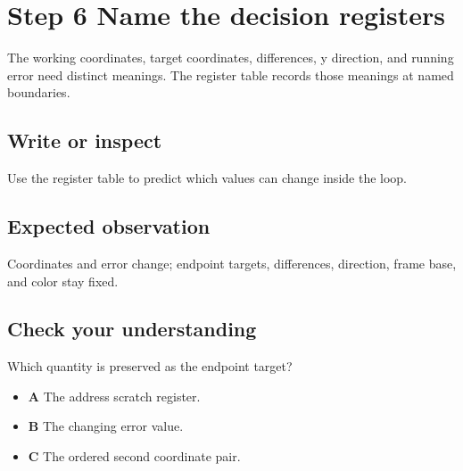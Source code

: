 \section{Step 6 Name the decision
  registers}\label{007-bresenham-line-s06-step-6-name-the-decision-registers}

The working coordinates, target coordinates, differences, y direction,
and running error need distinct meanings. The register table records
those meanings at named boundaries.

\subsection{Write or
  inspect}\label{007-bresenham-line-s06-write-or-inspect}

Use the register table to predict which values can change inside the
loop.

\subsection{Expected
  observation}\label{007-bresenham-line-s06-expected-observation}

Coordinates and error change; endpoint targets, differences, direction,
frame base, and color stay fixed.

\subsection{Check your
  understanding}\label{007-bresenham-line-s06-check-your-understanding}

Which quantity is preserved as the endpoint target?

\begin{itemize}
  \tightlist
  \item
        \textbf{A} The address scratch register.
  \item
        \textbf{B} The changing error value.
  \item
        \textbf{C} The ordered second coordinate pair.
\end{itemize}
